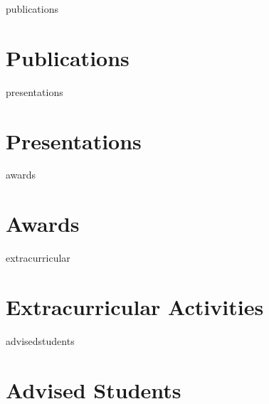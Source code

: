 \documentclass[12pt]{report} %
\begin{document}
\professional{}



\ifcsname publications\endcsname%
\section{Publications}
\publications{}
\fi



\ifcsname presentations\endcsname%
\section{Presentations}
\presentations{}
\fi



\ifcsname awards\endcsname%
\section{Awards}
\awards{}
\fi



\ifcsname extracurricular\endcsname%
\section{Extracurricular Activities}
\extracurricular{}
\fi



\ifcsname advisedstudents\endcsname%
\section{Advised Students}
\advisedstudents{}
\fi
\end{document}

